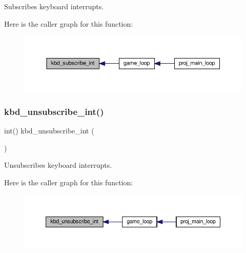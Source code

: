 Subscribes keyboard interrupts. 

Here is the caller graph for this function\+:
\nopagebreak
\begin{figure}[H]
\begin{center}
\leavevmode
\includegraphics[width=350pt]{group__keyboard_ga4ac9231a99a664d6a9f0b69767e0d707_icgraph}
\end{center}
\end{figure}
\mbox{\label{group__keyboard_gaee0a7b54ee426fade9c780418d110fe0}} 
\subsubsection{\texorpdfstring{kbd\+\_\+unsubscribe\+\_\+int()}{kbd\_unsubscribe\_int()}}
{\footnotesize\ttfamily int() kbd\+\_\+unsubscribe\+\_\+int (\begin{DoxyParamCaption}{ }\end{DoxyParamCaption})}



Unsubscribes keyboard interrupts. 

Here is the caller graph for this function\+:
\nopagebreak
\begin{figure}[H]
\begin{center}
\leavevmode
\includegraphics[width=350pt]{group__keyboard_gaee0a7b54ee426fade9c780418d110fe0_icgraph}
\end{center}
\end{figure}

